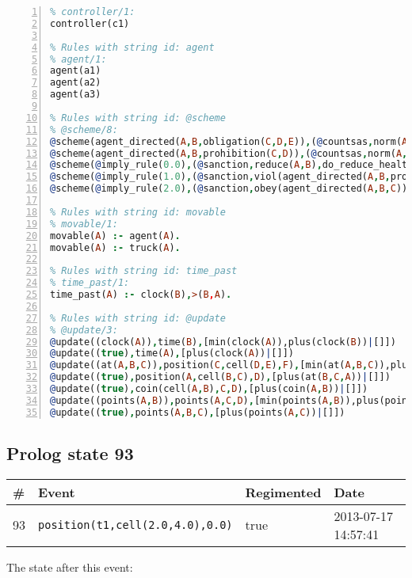 \documentclass[11pt]{article}\usepackage[utf8]{inputenc}\usepackage{geometry}
\begin{document}
\begin{lstlisting}[language=Prolog, numbers=left]
% Rules with string id: controller
% controller/1:
controller(c1)

% Rules with string id: agent
% agent/1:
agent(a1)
agent(a2)
agent(a3)

% Rules with string id: @scheme
% @scheme/8:
@scheme(agent_directed(A,B,obligation(C,D,E)),(@countsas,norm(A,B,F,obligation(C,D,E)),F),false,(listTrue(C)),(time_past(D)),false,[plus(viol(agent_directed(A,B,obligation(C,D,E))))|[]],[plus(obey(agent_directed(A,B,obligation(C,D,E))))|[]])
@scheme(agent_directed(A,B,prohibition(C,D)),(@countsas,norm(A,B,E,prohibition(C,D)),E),(listTrue(C)),false,(false),false,[plus(viol(agent_directed(A,B,prohibition(C,D))))|[]],[plus(obey(agent_directed(A,B,prohibition(C,D))))|[]])
@scheme(@imply_rule(0.0),(@sanction,reduce(A,B),do_reduce_health(A,B),notifyAgent(A,changed(status))),true,false,false,false,[min(reduce(A,B))|[]],[])
@scheme(@imply_rule(1.0),(@sanction,viol(agent_directed(A,B,prohibition(C,D))),do_sanction(D)),true,false,false,false,[min(viol(agent_directed(A,B,prohibition(C,D))))|[]],[])
@scheme(@imply_rule(2.0),(@sanction,obey(agent_directed(A,B,C))),true,false,false,false,[min(obey(agent_directed(A,B,C)))|[]],[])

% Rules with string id: movable
% movable/1:
movable(A) :- agent(A).
movable(A) :- truck(A).

% Rules with string id: time_past
% time_past/1:
time_past(A) :- clock(B),>(B,A).

% Rules with string id: @update
% @update/3:
@update((clock(A)),time(B),[min(clock(A)),plus(clock(B))|[]])
@update((true),time(A),[plus(clock(A))|[]])
@update((at(A,B,C)),position(C,cell(D,E),F),[min(at(A,B,C)),plus(at(D,E,C))|[]])
@update((true),position(A,cell(B,C),D),[plus(at(B,C,A))|[]])
@update((true),coin(cell(A,B),C,D),[plus(coin(A,B))|[]])
@update((points(A,B)),points(A,C,D),[min(points(A,B)),plus(points(A,D))|[]])
@update((true),points(A,B,C),[plus(points(A,C))|[]])

\end{lstlisting}
\clearpage 
\subsection{Prolog state 93}
\begin{table}[ht]
\centering 
\begin{tabular}{l l l l} 
\textbf{\#} & \textbf{Event} & \textbf{Regimented} & \textbf{Date} \\ [0.5ex] 
\hline
93&\texttt{position(t1,cell(2.0,4.0),0.0)}&true&2013-07-17 14:57:41\\ [1ex] \hline\end{tabular}
\end{table}
The state after this event:
\end{document}
